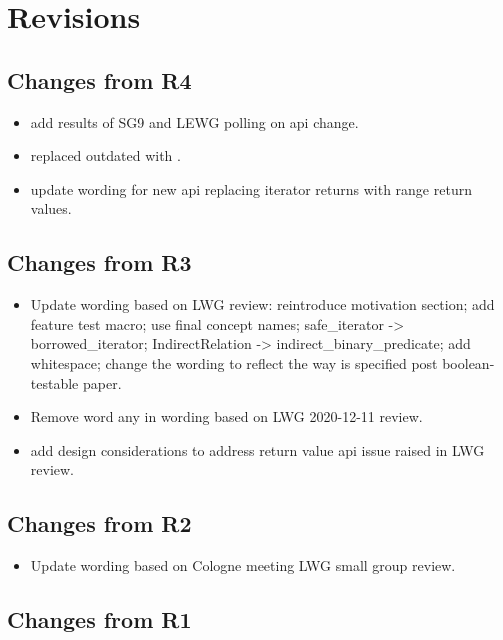 \section{Revisions}

\subsection{Changes from R4}

\begin{itemize}
  \item add results of SG9 and LEWG polling on api change.
  \item replaced outdated  with .
  \item update wording for new api replacing iterator returns with range return values.
\end{itemize}

\subsection{Changes from R3}

\begin{itemize}
  \item Update wording based on LWG review: reintroduce motivation section; add feature test macro; use final concept names; safe_iterator -> borrowed_iterator; IndirectRelation -> indirect_binary_predicate; add whitespace; change the wording to reflect the way  is specified post boolean-testable paper.
  \item Remove word any in wording based on LWG 2020-12-11 review.
  \item add design considerations to address return value api issue raised in LWG review.
\end{itemize}

\subsection{Changes from R2}

\begin{itemize}
  \item Update wording based on Cologne meeting LWG small group review.
\end{itemize}

\subsection{Changes from R1}


